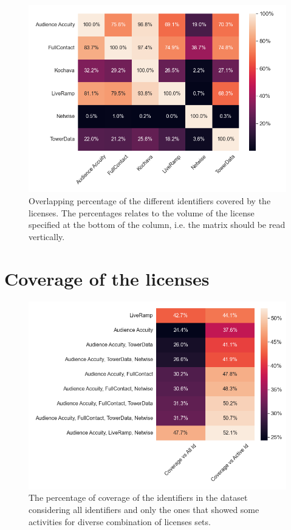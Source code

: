 \documentclass[11pt]{article} %
\begin{document}
\begin{figure}[h!]
  \includegraphics[width=0.8\linewidth]{../outputs/heatmap_percent_overlap.png}
  \caption{Overlapping percentage of the different identifiers covered by the licenses. The percentages relates to the volume of the license specified at the bottom of the column, i.e. the matrix should be read vertically.}
  \label{fig:heatmap_overlap}
\end{figure}

\clearpage
\newpage
\section{Coverage of the licenses}
\begin{figure}[h!]
  \includegraphics[width=0.7\linewidth]{../outputs/heatmap_percent_coverage.png}
  \caption{The percentage of coverage of the identifiers in the dataset considering all identifiers and only the ones that showed some activities for diverse combination of licenses sets.}
  \label{fig:heatmap_percent_coverage}
\end{figure}
\end{document}
